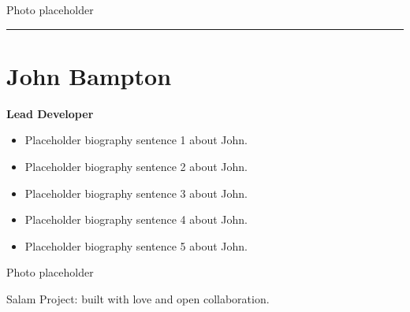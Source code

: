 \begin{center}
Photo placeholder
\end{center}

\vfill
\hrule
\vspace{1cm}

\section*{John Bampton}

\textbf{Lead Developer}

\bigskip

\begin{itemize}
\item Placeholder biography sentence 1 about John.
\item Placeholder biography sentence 2 about John.
\item Placeholder biography sentence 3 about John.
\item Placeholder biography sentence 4 about John.
\item Placeholder biography sentence 5 about John.
\end{itemize}

\bigskip

\begin{center}
Photo placeholder
\end{center}

\vfill

\begin{center}
\small Salam Project: built with love and open collaboration.
\end{center}
